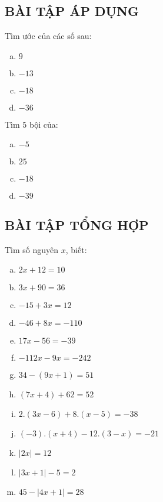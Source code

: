 \subsection{BÀI TẬP ÁP DỤNG}
\begin{bt} 
Tìm ước của các số sau:
\begin{multicols}{2}	
\begin{enumerate}[a)]
\item $9$
\item $- 13$
\item $- 18$
\item $- 36$
\end{enumerate}
\end{multicols}
\end{bt}   \begin{bt}
Tìm $5$ bội của:
\begin{multicols}{2}
\begin{enumerate}[a)]
\item $-5$ 
\item $25$
\item $-18$
\item $-39$
\end{enumerate}
\end{multicols}
\subsection{BÀI TẬP TỔNG HỢP}
\end{bt}   \begin{bt}
Tìm số nguyên $x$, biết:
\begin{enumerate}[a)] 
\item $2x + 12= 10$            	
\item $3x + 90 = 36$ 	
\item $-15 + 3x =12$ 
\item $-46 + 8x = -110$
\item $17x - 56 = -39$
\item $-112x - 9x =-242$
\item $34 - (9x+1) = 51$
\item $(7x+4) + 62 = 52$
\item $2.(3x-6) + 8.(x-5) = -38$
\item $(-3).(x+4) - 12.(3-x) = -21$
\item $|2x| = 12$
\item $|3x+ 1| -5 =2$
\item $45 - |4x+1| = 28$
\end{enumerate}


\end{bt}
